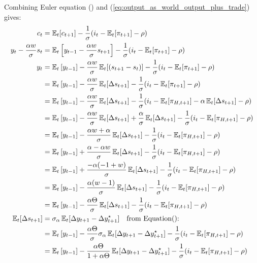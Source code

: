 \documentclass[12pt]{article}
\begin{document}
\begin{landscape}
Combining Euler equation () and (\ref{eq:output_as_world_output_plus_trade}) gives:
\begin{align*}
    c_t &=  \E_t[c_{t+1}] - \frac{1}{\sigma}( i_t  - \E_t [\pi_{t+1}] - \rho  ) \\
    y_t - \frac{\alpha w}{\sigma}s_t &= \E_t\left[y_{t-1} - \frac{\alpha w}{\sigma}s_{t+1} \right]- \frac{1}{\sigma}( i_t  - \E_t [\pi_{t+1}] - \rho  ) \\
    y_t &= \E_t\left[y_{t-1}\right] - \frac{\alpha w}{\sigma}\E_t[(s_{t+1}-s_t)]- \frac{1}{\sigma}( i_t  - \E_t [\pi_{t+1}] - \rho  ) \\
    &= \E_t\left[y_{t-1}\right] - \frac{\alpha w}{\sigma}\E_t[\Delta s_{t+1}]- \frac{1}{\sigma}( i_t  - \E_t [\pi_{t+1}] - \rho  ) \\
    &= \E_t\left[y_{t-1}\right] - \frac{\alpha w}{\sigma}\E_t[\Delta s_{t+1}]- \frac{1}{\sigma}( i_t  - \E_t [\pi_{H,t+1}] - \alpha \E_t[\Delta s_{t+1}] - \rho  ) \\
    &= \E_t\left[y_{t-1}\right] - \frac{\alpha w}{\sigma}\E_t[\Delta s_{t+1}] + \frac{\alpha}{\sigma} \E_t[\Delta s_{t+1}] - \frac{1}{\sigma}( i_t  - \E_t [\pi_{H,t+1}] - \rho  ) \\
    &= \E_t\left[y_{t-1}\right] - \frac{\alpha w+\alpha}{\sigma}\E_t[\Delta s_{t+1}] - \frac{1}{\sigma}( i_t  - \E_t [\pi_{H,t+1}] - \rho  ) \\
    &= \E_t\left[y_{t-1}\right] + \frac{\alpha - \alpha w}{\sigma}\E_t[\Delta s_{t+1}] - \frac{1}{\sigma}( i_t  - \E_t [\pi_{H,t+1}] - \rho  ) \\
    &= \E_t\left[y_{t-1}\right] + \frac{-\alpha (-1+w)}{\sigma}\E_t[\Delta s_{t+1}] - \frac{1}{\sigma}( i_t  - \E_t [\pi_{H,t+1}] - \rho  ) \\
    &= \E_t\left[y_{t-1}\right] - \frac{\alpha(w-1)}{\sigma}\E_t[\Delta s_{t+1}] - \frac{1}{\sigma}( i_t  - \E_t [\pi_{H,t+1}] - \rho  ) \\
    &= \E_t\left[y_{t-1}\right] - \frac{\alpha \Theta}{\sigma}\E_t[\Delta s_{t+1}] - \frac{1}{\sigma}( i_t  - \E_t [\pi_{H,t+1}] - \rho  ) \\
    \E_t[\Delta s_{t+1}] &= \sigma_\alpha \E_t[\Delta y_{t+1} - \Delta y_{t+1}^{\star}] \quad \text{from Equation(): } \\
    &= \E_t\left[y_{t-1}\right] - \frac{\alpha \Theta}{\sigma}\sigma_\alpha \E_t[\Delta y_{t+1} - \Delta y_{t+1}^{\star}] - \frac{1}{\sigma}( i_t  - \E_t [\pi_{H,t+1}] - \rho  ) \\
    &= \E_t\left[y_{t-1}\right] - \frac{\alpha \Theta}{1+\alpha \Theta} \E_t[\Delta y_{t+1} - \Delta y_{t+1}^{\star}] - \frac{1}{\sigma}( i_t  - \E_t [\pi_{H,t+1}] - \rho  ) \\

\end{align*}
\end{landscape}
\end{document}
